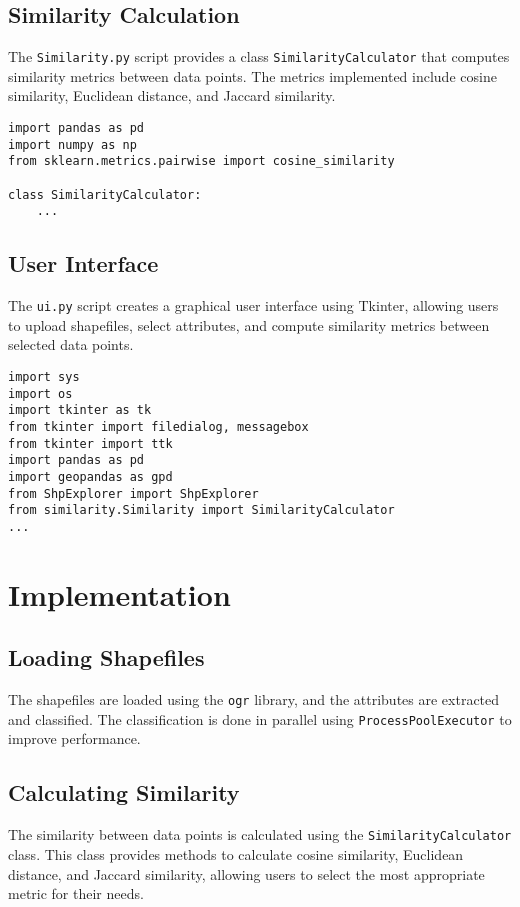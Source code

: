 \documentclass{article}
\begin{document}
\subsection{Similarity Calculation}
The \texttt{Similarity.py} script provides a class \texttt{SimilarityCalculator} that computes similarity metrics between data points. The metrics implemented include cosine similarity, Euclidean distance, and Jaccard similarity.

\begin{verbatim}
import pandas as pd
import numpy as np
from sklearn.metrics.pairwise import cosine_similarity

class SimilarityCalculator:
    ...
\end{verbatim}

\subsection{User Interface}
The \texttt{ui.py} script creates a graphical user interface using Tkinter, allowing users to upload shapefiles, select attributes, and compute similarity metrics between selected data points.

\begin{verbatim}
import sys
import os
import tkinter as tk
from tkinter import filedialog, messagebox
from tkinter import ttk
import pandas as pd
import geopandas as gpd
from ShpExplorer import ShpExplorer
from similarity.Similarity import SimilarityCalculator
...
\end{verbatim}

\section{Implementation}
\subsection{Loading Shapefiles}
The shapefiles are loaded using the \texttt{ogr} library, and the attributes are extracted and classified. The classification is done in parallel using \texttt{ProcessPoolExecutor} to improve performance.

\subsection{Calculating Similarity}
The similarity between data points is calculated using the \texttt{SimilarityCalculator} class. This class provides methods to calculate cosine similarity, Euclidean distance, and Jaccard similarity, allowing users to select the most appropriate metric for their needs.
\end{document}
